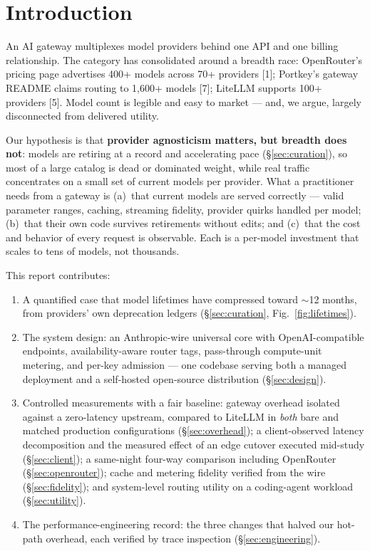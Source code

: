 \documentclass[10pt]{article}
\begin{document}
\section{Introduction}
An AI gateway multiplexes model providers behind one API and one billing relationship. The category has consolidated around a breadth race: OpenRouter's pricing page advertises 400+ models across 70+ providers [1]; Portkey's gateway README claims routing to 1{,}600+ models [7]; LiteLLM supports 100+ providers [5]. Model count is legible and easy to market --- and, we argue, largely disconnected from delivered utility.

Our hypothesis is that \textbf{provider agnosticism matters, but breadth does not}: models are retiring at a record and accelerating pace (\S\ref{sec:curation}), so most of a large catalog is dead or dominated weight, while real traffic concentrates on a small set of current models per provider. What a practitioner needs from a gateway is (a)~that current models are served correctly --- valid parameter ranges, caching, streaming fidelity, provider quirks handled per model; (b)~that their own code survives retirements without edits; and (c)~that the cost and behavior of every request is observable. Each is a per-model investment that scales to tens of models, not thousands.

This report contributes:
\begin{enumerate}\itemsep2pt
\item A quantified case that model lifetimes have compressed toward $\sim$12 months, from providers' own deprecation ledgers (\S\ref{sec:curation}, Fig.~\ref{fig:lifetimes}).
\item The system design: an Anthropic-wire universal core with OpenAI-compatible endpoints, availability-aware router tags, pass-through compute-unit metering, and per-key admission --- one codebase serving both a managed deployment and a self-hosted open-source distribution (\S\ref{sec:design}).
\item Controlled measurements with a fair baseline: gateway overhead isolated against a zero-latency upstream, compared to LiteLLM in \emph{both} bare and matched production configurations (\S\ref{sec:overhead}); a client-observed latency decomposition and the measured effect of an edge cutover executed mid-study (\S\ref{sec:client}); a same-night four-way comparison including OpenRouter (\S\ref{sec:openrouter}); cache and metering fidelity verified from the wire (\S\ref{sec:fidelity}); and system-level routing utility on a coding-agent workload (\S\ref{sec:utility}).
\item The performance-engineering record: the three changes that halved our hot-path overhead, each verified by trace inspection (\S\ref{sec:engineering}).
\end{enumerate}
\end{document}
